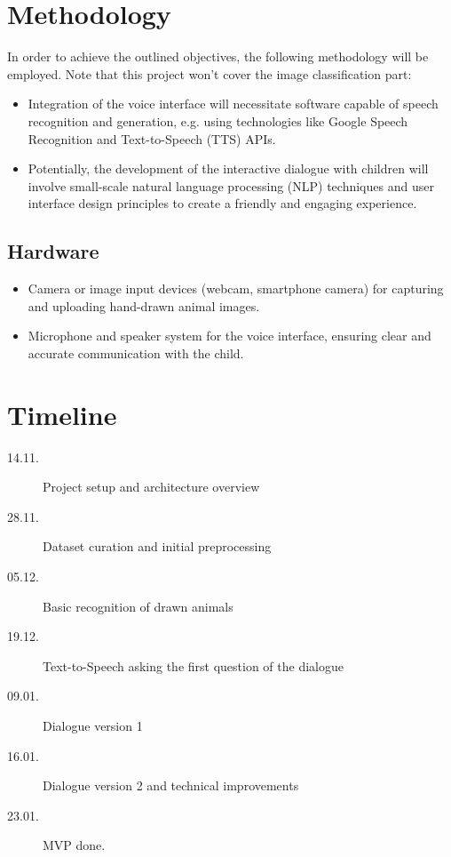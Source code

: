 \section{Methodology}
In order to achieve the outlined objectives, the following methodology will be employed. Note that this project won't cover the image classification part:
\begin{itemize}
  \item Integration of the voice interface will necessitate software capable of speech recognition and generation, e.g. using technologies like Google Speech Recognition and Text-to-Speech (TTS) APIs.
  \item Potentially, the development of the interactive dialogue with children will involve small-scale natural language processing (NLP) techniques and user interface design principles to create a friendly and engaging experience.
\end{itemize}
\subsection{Hardware}
\begin{itemize}
  \item Camera or image input devices (webcam, smartphone camera) for capturing and uploading hand-drawn animal images.
  \item Microphone and speaker system for the voice interface, ensuring clear and accurate communication with the child.
\end{itemize}

\section{Timeline}
\begin{description}
\item[14.11.] Project setup and architecture overview
\item[28.11.] Dataset curation and initial preprocessing
\item[05.12.] Basic recognition of drawn animals
\item[19.12.] Text-to-Speech asking the first question of the dialogue
\item[09.01.] Dialogue version 1
\item[16.01.] Dialogue version 2 and technical improvements
\item[23.01.] MVP done.
\end{description}



